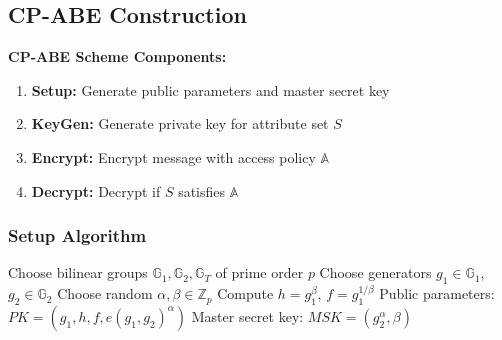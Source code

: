 \documentclass[11pt,a4paper]{article}
\begin{document}
\subsection{CP-ABE Construction}

\begin{mathbox}
\textbf{CP-ABE Scheme Components:}
\begin{enumerate}
    \item \textbf{Setup:} Generate public parameters and master secret key
    \item \textbf{KeyGen:} Generate private key for attribute set $S$
    \item \textbf{Encrypt:} Encrypt message with access policy $\mathbb{A}$
    \item \textbf{Decrypt:} Decrypt if $S$ satisfies $\mathbb{A}$
\end{enumerate}
\end{mathbox}

\subsubsection{Setup Algorithm}

\begin{algorithm}
\caption{CP-ABE Setup}
\begin{algorithmic}
\STATE Choose bilinear groups $\mathbb{G}_1, \mathbb{G}_2, \mathbb{G}_T$ of prime order $p$
\STATE Choose generators $g_1 \in \mathbb{G}_1$, $g_2 \in \mathbb{G}_2$
\STATE Choose random $\alpha, \beta \in \mathbb{Z}_p$
\STATE Compute $h = g_1^\beta$, $f = g_1^{1/\beta}$
\STATE Public parameters: $PK = (g_1, h, f, e(g_1, g_2)^\alpha)$
\STATE Master secret key: $MSK = (g_2^\alpha, \beta)$
\end{algorithmic}
\end{algorithm}
\end{document}
